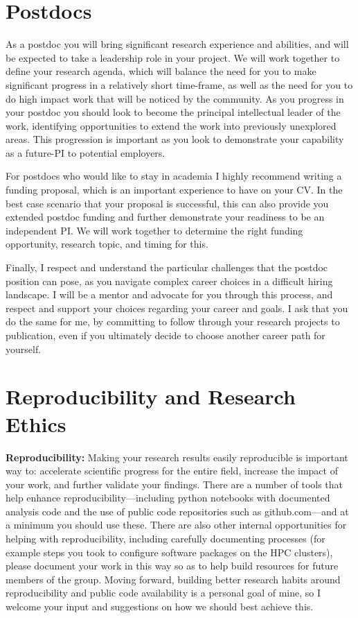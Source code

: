 \documentclass{classassignments}
\begin{document}
\section{Postdocs}
As a postdoc you will bring significant research experience and abilities, and will be expected to take a leadership role in your project. We will work together to define your research agenda, which will balance the need for you to make significant progress in a relatively short time-frame, as well as the need for you to do high impact work that will be noticed by the community. As you progress in your postdoc you should look to become the principal intellectual leader of the work, identifying opportunities to extend the work into previously unexplored areas. This progression is important as you look to demonstrate your capability as a future-PI to potential employers. \medskip

For postdocs who would like to stay in academia I highly recommend writing a funding proposal, which is an important experience to have on your CV. In the best case scenario that your proposal is successful, this can also provide you extended postdoc funding and further demonstrate your readiness to be an independent PI. We will work together to determine the right funding opportunity, research topic, and timing for this.\medskip

Finally, I respect and understand the particular challenges that the postdoc position can pose, as you navigate complex career choices in a difficult hiring landscape. I will be a mentor and advocate for you through this process, and respect and support your choices regarding your career and goals. I ask that you do the same for me, by committing to follow through your research projects to publication, even if you ultimately decide to choose another career path for yourself.

\section{Reproducibility and Research Ethics}
\textbf{Reproducibility:} Making your research results easily reproducible is important way to: accelerate scientific progress for the entire field, increase the impact of your work, and further validate your findings. There are a number of tools that help enhance reproducibility---including python notebooks with documented analysis code and the use of public code repositories such as github.com---and at a minimum you should use these. There are also other internal opportunities for helping with reproducibility, including carefully documenting processes (for example steps you took to configure software packages on the HPC clusters), please document your work in this way so as to help build resources for future members of the group. Moving forward, building better research habits around reproducibility and public code availability is a personal goal of mine, so I welcome your input and suggestions on how we should best achieve this.\bigskip
\end{document}
